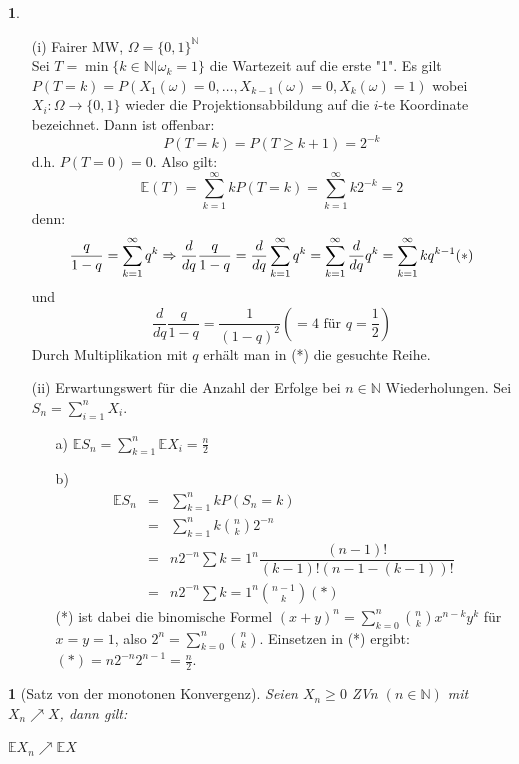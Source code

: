 \documentclass[10pt,a4paper]{report}
\numberwithin{equation}{section}
\numberwithin{figure}{section}
\theoremstyle{plain}
\theoremstyle{definition}
\newtheorem{example}[thm]{\protect\examplename}
\theoremstyle{remark}
\theoremstyle{plain}
\newtheorem{prop}[thm]{\protect\propositionname}
\providecommand{\examplename}{Beispiel}
\providecommand{\propositionname}{Satz}
\newcommand{\1}{ \mathbb{1} } %
\begin{document}
\begin{example} \ 
  \begin{itemize}
  \item[(i)] Fairer MW, $\Omega=\{0,1\}^{\mathbb{N}}$\\
    Sei $T=\min\{k\in \mathbb{N}|\omega_k=1\}$ die Wartezeit auf die erste "1".
    Es gilt $P(T=k)=P(X_1(\omega)=0,\dots,X_{k-1}(\omega)=0,X_k(\omega)=1)$ wobei $X_i:\Omega \to \{0,1\}$ wieder die Projektionsabbildung auf die $i$-te Koordinate bezeichnet. Dann ist offenbar:
    \[P(T=k)=P(T\geq k+1)=2^{-k}\] 
d.h. $P(T=0)=0$. Also gilt:
    \[\mathbb{E}(T)=\sum\limits_{k=1}^\infty kP(T=k)=\sum\limits_{k=1}^\infty k2^{-k}=2\]
    denn: \[\dfrac{q}{1-q}=\sum\limits_{k=1}^\infty q^k \Rightarrow \dfrac{d}{dq}\dfrac{q}{1-q}=\dfrac{d}{dq}\sum\limits_{k=1}^\infty q^k=\sum\limits_{k=1}^\infty \dfrac{d}{dq} q^k=\sum\limits_{k=1}^\infty kq^{k-1} \hfill (*)\]
    und \[\dfrac{d}{dq}\dfrac{q}{1-q}=\dfrac{1}{(1-q)^2} (=4 \text{ für } q=\dfrac{1}{2})\]
    Durch Multiplikation mit $q$ erhält man in (*) die gesuchte Reihe.
    \item[(ii)] Erwartungswert für die Anzahl der Erfolge bei $n \in \mathbb{N}$ Wiederholungen. Sei $S_n=\sum\limits_{i=1}^nX_i$.
      \begin{itemize}
      \item[a)]
        $\mathbb{E}S_n=\sum\limits_{k=1}^n\mathbb{E}X_i=\frac{n}{2}$
        \item[b)]\begin{eqnarray*}
          \mathbb{E}S_n&=&\sum\limits_{k=1}^nkP(S_n=k)\\
          &=& \sum\limits_{k=1}^nk\binom{n}{k}2^{-n}\\
          &=& n 2^{-n} \sum\limits{k=1}^n\dfrac{(n-1)!}{(k-1)!(n-1-(k-1))!}\\
          &=& n 2^{-n} \sum\limits{k=1}^n \binom{n-1}{k} (*)
        \end{eqnarray*}
        (*) ist dabei die binomische Formel $(x+y)^n=\sum\limits_{k=0}^n\binom{n}{k}x^{n-k}y^k$ für $x=y=1$, also $2^n=\sum\limits_{k=0}^n\binom{n}{k}$. Einsetzen in (*) ergibt: $(*)=n2^{-n}2^{n-1}=\frac{n}{2}$.
      \end{itemize}
  \end{itemize}

\end{example}
\begin{prop}[Satz von der monotonen Konvergenz]
  Seien $X_n\geq 0$ ZVn $(n \in \mathbb{N})$ mit $X_n \nearrow X$,
  dann gilt:
  \begin{center}
    $\mathbb{E}X_n \nearrow \mathbb{E}X$
  \end{center}
\end{prop}
\end{document}
